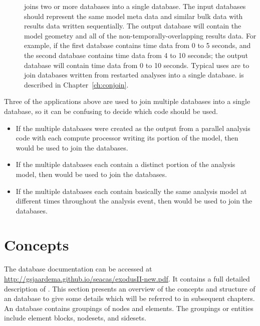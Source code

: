 \begin{description}
\item[\conjoin] joins two or more \exo{} databases into a single
database. The input databases should represent the same model meta
data and similar bulk data with results data written sequentially. The
output database will contain the model geometry and all of the
non-temporally-overlapping results data. For example, if the first
database contains time data from 0 to 5 seconds, and the second
database contains time data from 4 to 10 seconds; the output database
will contain time data from 0 to 10 seconds.  Typical uses are to join
databases written from restarted analyses into a single database.
\conjoin{} is described in Chapter~\ref{ch:conjoin}. 
\end{description}

Three of the applications above are used to join multiple \exo{}
databases into a single \exo{} database, so it can be confusing to
decide which code should be used.
\begin{itemize}
\item If the multiple \exo{} databases were created as the output from a
parallel analysis code with each compute processor writing its portion
of the model, then \epu{} would be used to join the databases.

\item If the multiple \exo{} databases each contain a distinct portion of the
analysis model, then \ejoin{} would be used to join the databases.

\item If the multiple \exo{} databases each contain basically the same
analysis model at different times throughout the analysis event, then
\conjoin{} would be used to join the databases.

\end{itemize}

\section{\exo{} Concepts}
The \exo{} database documentation can be accessed at
\url{http://gsjaardema.github.io/seacas/exodusII-new.pdf}. It
contains a full detailed description of \exo{}. This section presents
an overview of the concepts and structure of an \exo{} database to give some
details which will be referred to in subsequent chapters. An \exo{}
database contains groupings of nodes and elements.  The groupings or
entities include element blocks, nodesets, and sidesets.

